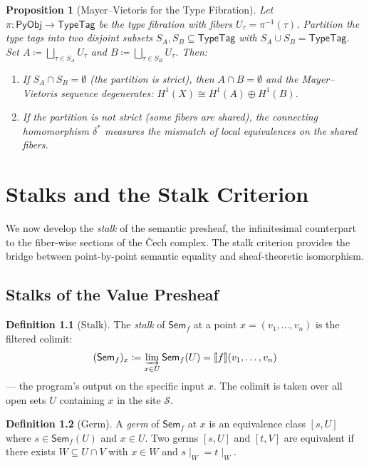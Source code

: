\documentclass[11pt,a4paper]{report}
\theoremstyle{definition}
\newtheorem{definition}{Definition}[chapter]
\theoremstyle{plain}
\newtheorem{proposition}[definition]{Proposition}
\newcommand{\den}[1]{\llbracket #1 \rrbracket}
\newcommand{\PyObj}{\mathsf{PyObj}}
\newcommand{\Sem}{\mathsf{Sem}}
\newcommand{\Hone}{H^1}
\newcommand{\site}{\mathcal{S}}
\newcommand{\restr}[2]{#1\!\!\mid_{#2}}
\begin{document}
\begin{proposition}[Mayer--Vietoris for the Type Fibration]
\label{prop:mv-fibration}
Let $\pi : \PyObj \to \mathsf{TypeTag}$ be the type fibration with
fibers $U_\tau = \pi^{-1}(\tau)$.  Partition the type tags into two
disjoint subsets $S_A, S_B \subseteq \mathsf{TypeTag}$ with
$S_A \cup S_B = \mathsf{TypeTag}$.  Set
$A \coloneqq \bigsqcup_{\tau \in S_A} U_\tau$ and
$B \coloneqq \bigsqcup_{\tau \in S_B} U_\tau$.  Then:
\begin{enumerate}
  \item If $S_A \cap S_B = \emptyset$ (the partition is strict), then
    $A \cap B = \emptyset$ and the Mayer--Vietoris sequence degenerates:
    $\Hone(X) \cong \Hone(A) \oplus \Hone(B)$.
  \item If the partition is not strict (some fibers are shared), the
    connecting homomorphism $\delta^*$ measures the mismatch of local
    equivalences on the shared fibers.
\end{enumerate}
\end{proposition}


\chapter{Stalks and the Stalk Criterion}
\label{ch:stalks}

We now develop the \emph{stalk} of the semantic presheaf, the
infinitesimal counterpart to the fiber-wise sections of the \v{C}ech
complex.  The stalk criterion provides the bridge between
point-by-point semantic equality and sheaf-theoretic isomorphism.

\section{Stalks of the Value Presheaf}

\begin{definition}[Stalk]
\label{def:stalk}
The \emph{stalk} of $\Sem_f$ at a point $x = (v_1, \ldots, v_n)$ is
the filtered colimit:
\[
  (\Sem_f)_x \coloneqq \varinjlim_{x \in U} \Sem_f(U) = \den{f}(v_1, \ldots, v_n)
\]
--- the program's output on the specific input $x$.  The colimit is
taken over all open sets $U$ containing $x$ in the site $\site$.
\end{definition}

\begin{definition}[Germ]
\label{def:germ}
A \emph{germ} of $\Sem_f$ at $x$ is an equivalence class $[s, U]$ where
$s \in \Sem_f(U)$ and $x \in U$.  Two germs $[s, U]$ and $[t, V]$
are equivalent if there exists $W \subseteq U \cap V$ with $x \in W$
and $\restr{s}{W} = \restr{t}{W}$.
\end{definition}
\end{document}
